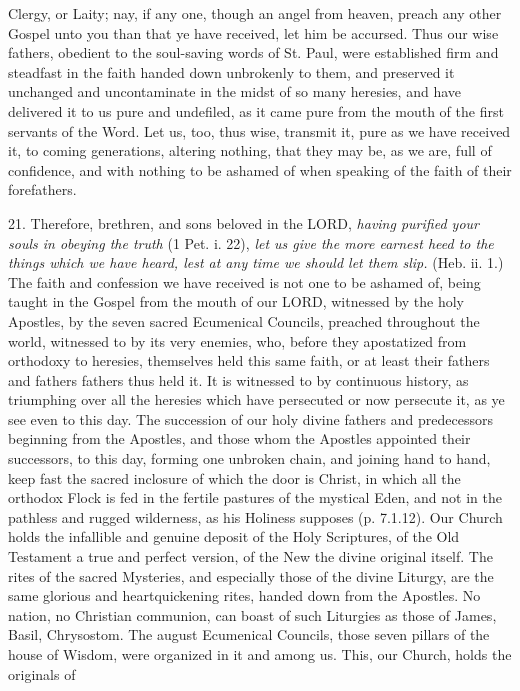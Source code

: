 Clergy, or Laity; nay, if any one, though an angel from heaven, preach
any other Gospel unto you than that ye have received, let him be
accursed. Thus our wise fathers, obedient to the soul-saving words of
St. Paul, were established firm and steadfast in the faith handed down
unbrokenly to them, and preserved it unchanged and uncontaminate in the
midst of so many heresies, and have delivered it to us pure and
undefiled, as it came pure from the mouth of the first servants of the
Word. Let us, too, thus wise, transmit it, pure as we have received it,
to coming generations, altering nothing, that they may be, as we are,
full of confidence, and with nothing to be ashamed of when speaking of
the faith of their forefathers.

21. Therefore, brethren, and sons beloved in the LORD, \emph{having
purified your souls in obeying the truth} (1 \emph{} Pet. i. 22),
\emph{let us give the more earnest heed to the things which we have
heard, lest at any time we should let them slip.} (Heb. ii. 1.) The
faith and confession we have received is not one to be ashamed of, being
taught in the Gospel from the mouth of our LORD, witnessed by the holy
Apostles, by the seven sacred Ecumenical Councils, preached throughout
the world, witnessed to by its very enemies, who, before they
apostatized from orthodoxy to heresies, themselves held this same faith,
or at least their fathers and fathers\textquotesingle{} fathers thus
held it. It is witnessed to by continuous history, as triumphing over
all the heresies which have persecuted or now persecute it, as ye see
even to this day. The succession of our holy divine fathers and
predecessors beginning from the Apostles, and those whom the Apostles
appointed their successors, to this day, forming one unbroken chain, and
joining hand to hand, keep fast the sacred inclosure of which the door
is Christ, in which all the orthodox Flock is fed in the fertile
pastures of the mystical Eden, and not in the pathless and rugged
wilderness, as his Holiness supposes (p. 7.1.12). Our Church holds the
infallible and genuine deposit of the Holy Scriptures, of the Old
Testament a true and perfect version, of the New the divine original
itself. The rites of the sacred Mysteries, and especially those of the
divine Liturgy, are the same glorious and heartquickening rites, handed
down from the Apostles. No nation, no Christian communion, can boast of
such Liturgies as those of James, Basil, Chrysostom. The august
Ecumenical Councils, those seven pillars of the house of Wisdom, were
organized in it and among us. This, our Church, holds the originals of
